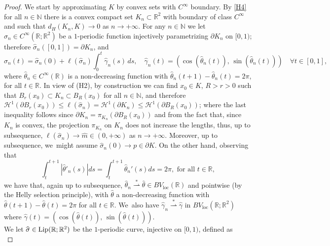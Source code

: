 \documentclass[JEP,XML,SOM,Unicode, NoFloatCountersInSection,published]{cedram}
\newcommand{\R}{\mathbb{R}}
\renewcommand\H{\mathcal H}
\let\len\ell
\newcommand{\weakstar}{\stackrel{*}{\rightharpoonup}}
\theoremstyle{definition}
\begin{document}
\begin{proof}
We start by approximating $K$ by convex sets with $C^\infty$ boundary. By \ref{H4} for all $n\in\mathbb{N}$ there is a convex compact set $K_n\subset\R^2$ with boundary of class $C^\infty$ and such that
$d_H(K_n,K)\to0$ as $n\to +\infty$.
For any $n\in\mathbb{N}$ we let $\widehat\sigma_n\in C^\infty(\mathbb R;\R^2)$ be a $1$\nobreakdash-periodic function injectively parametrizing $\partial K_n$ on $[0,1)$; therefore $\widehat\sigma_n([0,1])=\partial K_n$, and
\begin{equation*}
\widehat \sigma_n(t)=\widehat \sigma_n(0)+\len(\widehat\sigma_n)\int_0^t\widehat\gamma_n(s)\,ds,\quad \widehat\gamma_n(t)=(\cos(\widehat\theta_n(t)),\,\sin(\widehat\theta_n(t)))
\quad \forall t\in [0,1],
\end{equation*}
where $\widehat \theta_n\!\in\! C^\infty(\R)$ is a non-decreasing function with $\widehat\theta_n(t+1)-\widehat\theta_n(t)\!=\!2\pi$, for all \hbox{$t\!\in\! \mathbb R$}.
In view of (H2), by construction we can find $x_0\in K$, $R>r>0$ such that $B_r(x_0)\subset K_n\subset B_R(x_0)$ for all $n\in \mathbb N$, and therefore
$\mathcal{H}^1(\partial B_r(x_0))\le \len(\widehat\sigma_n)=
\H^1(\mathcal \partial K_n)\le\H^1(\partial B_R(x_0))$; where the last inequality follows since $\partial K_n=\pi_{K_n}(\partial B_R(x_0))$ and from the fact that, since $K_n$ is convex, the projection $\pi_{K_n}$ on $K_n$ does not increase the lengths, thus, up to subsequence, $\len(\widehat\sigma_n)\to \widehat m\in(0,+\infty)$ as $n\to +\infty$. Moreover, up to subsequence, we~might assume $\widehat\sigma_n(0)\to p\in \partial K$.
On the other hand, observing that
\begin{equation*}
\int_t^{t+1}|\widehat\theta'_n(s)|ds=\int_t^{t+1}\widehat\theta_n'(s)ds=2\pi, \text{ for all }t\in \mathbb R,
\end{equation*}
we have that, again up to subsequence, $\widehat\theta_n\weakstar\widehat\theta\in BV_{\mathrm{loc}}(\R)$ and pointwise (by the Helly selection principle), with $\widehat\theta$ a non-decreasing function with $\widehat \theta(t+1)-\widehat \theta(t)=2\pi$ for all $t\in \mathbb R$. We~also have $\widehat \gamma_n\weakstar\widehat \gamma$ in $BV_{\mathrm{loc}}(\mathbb R;\mathbb R^2)$ where $\widehat \gamma(t)=(\cos(\widehat \theta(t)),\,\sin(\widehat \theta(t)))$.\\
We let $\widehat \sigma\in {\rm{Lip}}(\R;\R^2)$ be the $1$-periodic curve, injective on $[0,1)$, defined as
\begin{equation}\label{sigma_boundary}

\end{equation}
\end{proof}
\end{document}

